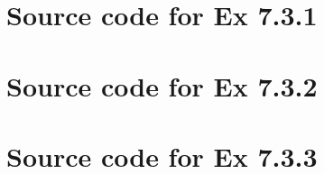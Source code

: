 \documentclass{report}
\begin{document}



\chapter{Source code for Ex 7.3.1}
\label{cha:source-code-7-3-1}




\chapter{Source code for Ex 7.3.2}
\label{cha:source-code-7-3-2}



\chapter{Source code for Ex 7.3.3}
\label{cha:source-code-7-3-3}


\end{document}
